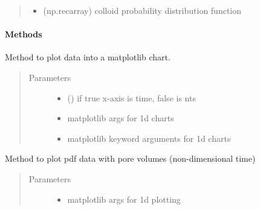 \documentclass[letterpaper,10pt,english]{sphinxmanual}
\begin{document}
\begin{fulllineitems}
\begin{quote}
\begin{description}
\begin{itemize}
\item {} 
 \textendash{} (np.recarray) colloid probability distribution function

\end{itemize}

\end{description}\end{quote}
\paragraph{Methods}

\begin{fulllineitems}
\label{\detokenize{index:lb_colloids.Colloids.Colloid_output.DistributionFunction.plot}}
Method to plot data into a matplotlib chart.
\begin{quote}\begin{description}
\item[{Parameters}] \leavevmode\begin{itemize}
\item {} 
 () \textendash{} if true x-axis is time, false is nts

\item {} 
 \textendash{} 
matplotlib args for 1d charts


\item {} 
 \textendash{} 
matplotlib keyword arguments for 1d charts


\end{itemize}

\end{description}\end{quote}

\end{fulllineitems}


\begin{fulllineitems}
\label{\detokenize{index:lb_colloids.Colloids.Colloid_output.DistributionFunction.plot_pv}}
Method to plot pdf data with pore volumes (non-dimensional time)
\begin{quote}\begin{description}
\item[{Parameters}] \leavevmode\begin{itemize}
\item {} 
 \textendash{} 
matplotlib args for 1d plotting



\end{itemize}
\end{description}
\end{quote}
\end{fulllineitems}
\end{fulllineitems}
\end{document}
